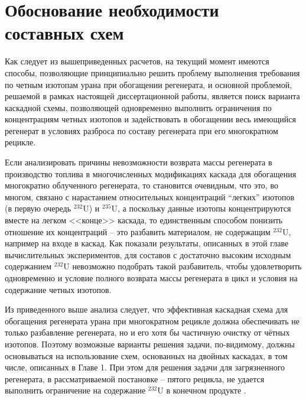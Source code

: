 \section{Обоснование необходимости составных схем}\label{sec:ch2/sec2}

Как следует из вышеприведенных расчетов, на текущий момент имеются способы, позволяющие принципиально решить проблему выполнения требования по четным изотопам урана при обогащении регенерата, и основной проблемой, решаемой в рамках настоящей диссертационной работы, является поиск варианта каскадной схемы, позволяющей одновременно выполнить ограничения по концентрациям четных изотопов и задействовать в обогащении весь имеющийся регенерат в условиях разброса по составу регенерата при его многократном рецикле.

Если анализировать причины невозможности возврата массы регенерата в производство топлива в многочисленных модификациях каскада для обогащения многократно облученного регенерата, то становится очевидным, что это, во многом, связано с нарастанием относительных концентраций “легких” изотопов (в первую очередь $^{232}$U) и
$^{235}$U, а поскольку данные изотопы концентрируются вместе на легком <<конце>> каскада, то единственным способом понизить отношение их концентраций -- это разбавить материалом, не содержащим $^{232}$U, например на входе в каскад. Как показали результаты, описанных в этой главе вычислительных экспериментов, для составов с достаточно высоким исходным содержанием $^{232}$U невозможно подобрать такой разбавитель, чтобы удовлетворить одновременно и условие полного возврата массы регенерата в цикл и условия на содержание четных изотопов.

Из приведенного выше анализа следует, что эффективная каскадная схема для обогащения регенерата урана при многократном рецикле должна обеспечивать не только разбавление регенерата, но и его хотя бы частичную очистку от чётных изотопов. Поэтому возможные варианты решения задачи, по-видимому, должны основываться на использование схем, основанных на двойных каскадах, в том числе, описанных в Главе 1. При этом для решения задачи для загрязненного регенерата, в рассматриваемой постановке -- пятого рецикла, не удается выполнить ограничение на содержание $^{232}$U в конечном продукте \cite{gusevMultycascadeEnrichmentSchemes2020}.


\clearpage

